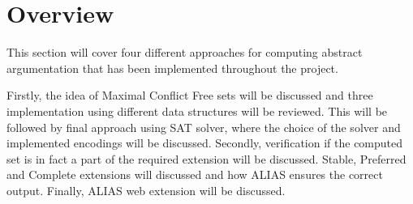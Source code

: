 \section{Overview}
This section will cover four different approaches for computing abstract argumentation that has been implemented throughout the project. 

Firstly, the idea of Maximal Conflict Free sets will be discussed and three implementation using different data structures will be reviewed. This will be followed by final approach using SAT solver, where the choice of the solver and implemented encodings will be discussed. Secondly, verification if the computed set is in fact a part of the required extension will be discussed. Stable, Preferred and Complete extensions will discussed and how ALIAS ensures the correct output. Finally, ALIAS web extension will be discussed.